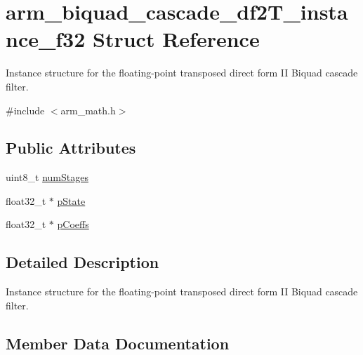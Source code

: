 \hypertarget{structarm__biquad__cascade__df2_t__instance__f32}{}\section{arm\+\_\+biquad\+\_\+cascade\+\_\+df2\+T\+\_\+instance\+\_\+f32 Struct Reference}
\label{structarm__biquad__cascade__df2_t__instance__f32}


Instance structure for the floating-\/point transposed direct form II Biquad cascade filter.  




{\ttfamily \#include $<$arm\+\_\+math.\+h$>$}

\subsection*{Public Attributes}
\begin{DoxyCompactItemize}
\item 
uint8\+\_\+t \hyperlink{structarm__biquad__cascade__df2_t__instance__f32_a4d17958c33c3d0a905f974bac50f033f}{num\+Stages}
\item 
float32\+\_\+t $\ast$ \hyperlink{structarm__biquad__cascade__df2_t__instance__f32_a24d223addfd926a7177088cf2efe76b1}{p\+State}
\item 
float32\+\_\+t $\ast$ \hyperlink{structarm__biquad__cascade__df2_t__instance__f32_a49a24fe1b6ad3b0b26779c32d8d80b2e}{p\+Coeffs}
\end{DoxyCompactItemize}


\subsection{Detailed Description}
Instance structure for the floating-\/point transposed direct form II Biquad cascade filter. 

\subsection{Member Data Documentation}
